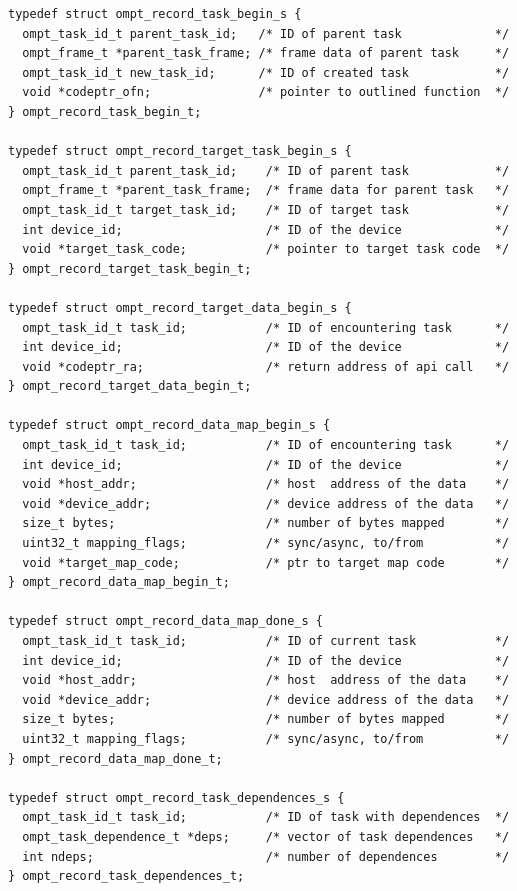 \documentclass{article}
\begin{document}
{\begin{verbatim}
typedef struct ompt_record_task_begin_s {
  ompt_task_id_t parent_task_id;   /* ID of parent task             */
  ompt_frame_t *parent_task_frame; /* frame data of parent task     */
  ompt_task_id_t new_task_id;      /* ID of created task            */
  void *codeptr_ofn;               /* pointer to outlined function  */
} ompt_record_task_begin_t;

typedef struct ompt_record_target_task_begin_s {
  ompt_task_id_t parent_task_id;    /* ID of parent task            */
  ompt_frame_t *parent_task_frame;  /* frame data for parent task   */
  ompt_task_id_t target_task_id;    /* ID of target task            */
  int device_id;                    /* ID of the device             */
  void *target_task_code;           /* pointer to target task code  */
} ompt_record_target_task_begin_t;

typedef struct ompt_record_target_data_begin_s {
  ompt_task_id_t task_id;           /* ID of encountering task      */
  int device_id;                    /* ID of the device             */
  void *codeptr_ra;                 /* return address of api call   */
} ompt_record_target_data_begin_t;
 
typedef struct ompt_record_data_map_begin_s {
  ompt_task_id_t task_id;           /* ID of encountering task      */
  int device_id;                    /* ID of the device             */
  void *host_addr;                  /* host  address of the data    */
  void *device_addr;                /* device address of the data   */ 
  size_t bytes;                     /* number of bytes mapped       */
  uint32_t mapping_flags;           /* sync/async, to/from          */
  void *target_map_code;            /* ptr to target map code       */
} ompt_record_data_map_begin_t;

typedef struct ompt_record_data_map_done_s {
  ompt_task_id_t task_id;           /* ID of current task           */
  int device_id;                    /* ID of the device             */
  void *host_addr;                  /* host  address of the data    */
  void *device_addr;                /* device address of the data   */ 
  size_t bytes;                     /* number of bytes mapped       */
  uint32_t mapping_flags;           /* sync/async, to/from          */
} ompt_record_data_map_done_t;

typedef struct ompt_record_task_dependences_s {
  ompt_task_id_t task_id;           /* ID of task with dependences  */
  ompt_task_dependence_t *deps;     /* vector of task dependences   */
  int ndeps;                        /* number of dependences        */
} ompt_record_task_dependences_t;


\end{verbatim}}
\end{document}
